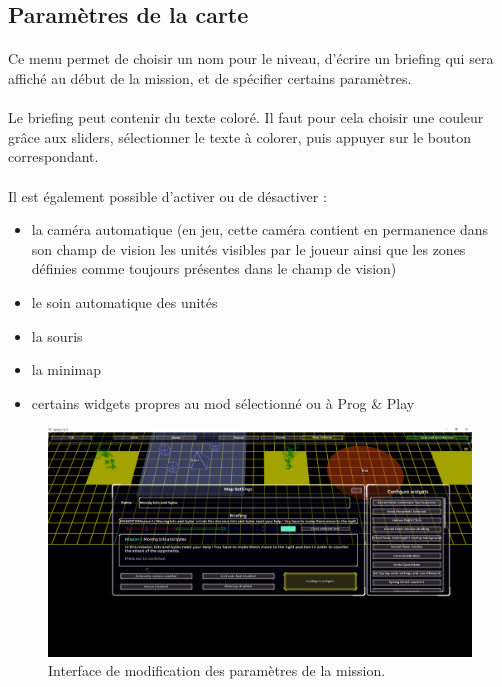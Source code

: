 \documentclass[a4paper]{article}
\begin{document}
\subsection{Paramètres de la carte}
\paragraph{ }
Ce menu permet de choisir un nom pour le niveau, d'écrire un briefing qui sera affiché au début de la mission, et de spécifier certains paramètres.
\paragraph{ }
Le briefing peut contenir du texte coloré. Il faut pour cela choisir une couleur grâce aux sliders, sélectionner le texte à colorer, puis appuyer sur le bouton correspondant.
\paragraph{ }
Il est également possible d'activer ou de désactiver :
\begin{itemize}
\item la caméra automatique (en jeu, cette caméra contient en permanence dans son champ de vision les unités visibles par le joueur ainsi que les zones définies comme toujours présentes dans le champ de vision)
\item le soin automatique des unités
\item la souris
\item la minimap
\item certains widgets propres au mod sélectionné ou à Prog \& Play
\end{itemize}
\begin{figure}[H]
\centering
\includegraphics[width=\linewidth]{editor-mapsettings.png}
\caption{Interface de modification des paramètres de la mission.}
\label{fig:editor-mapsettings}
\end{figure}
\end{document}
